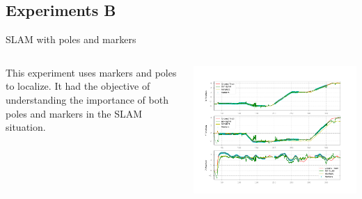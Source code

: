 \documentclass[serif,aspectratio=169]{beamer}
\begin{document}
    \subsection{Experiments B}
    \begin{frame}{SLAM with poles and markers}
        \begin{columns}[c]
            \begin{column}{.5\textwidth}
                This experiment uses markers and poles to localize. It had the objective of understanding the importance of both poles and markers in the SLAM situation.
            \end{column}
            \begin{column}{.5\textwidth}
                \centering
                \includegraphics[height=0.8\textheight]{Images/fig22-true-poles-markers-nomap.png}
            \end{column}
        \end{columns}
    \end{frame}
\end{document}
